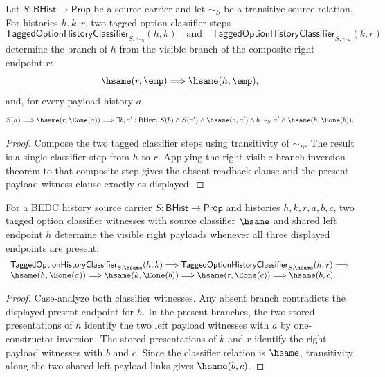 \begin{theorem}
\label{thm:tagged-option-history-classifier-composite-right-visible-readback}
Let $S:\mathsf{BHist}\to\mathsf{Prop}$ be a source carrier and let
$\sim_S$ be a transitive source relation. For histories $h,k,r$, two tagged
option classifier steps
$$
\mathsf{TaggedOptionHistoryClassifier}_{S,\sim_S}(h,k)
\quad\text{and}\quad
\mathsf{TaggedOptionHistoryClassifier}_{S,\sim_S}(k,r)
$$
determine the branch of $h$ from the visible branch of the composite right
endpoint $r$:
$$
\hsame(r,\emp)\Longrightarrow \hsame(h,\emp),
$$
and, for every payload history $a$,
$$
S(a)\Longrightarrow \hsame(r,\Eone(a))\Longrightarrow
\exists b,a':\mathsf{BHist}.\;
S(b)\land S(a')\land \hsame(a,a')\land b\sim_S a'\land
\hsame(h,\Eone(b)).
$$
\end{theorem}
\begin{proof}
Compose the two tagged classifier steps using transitivity of $\sim_S$. The
result is a single classifier step from $h$ to $r$. Applying the right
visible-branch inversion theorem to that composite step gives the absent
readback clause and the present payload witness clause exactly as displayed.
\end{proof}

\begin{theorem}
\label{thm:tagged-option-history-classifier-hsame-shared-left-visible-right-deterministic}
For a BEDC history source carrier $S:\mathsf{BHist}\to\mathsf{Prop}$ and
histories $h,k,r,a,b,c$, two tagged option classifier witnesses with source
classifier $\hsame$ and shared left endpoint $h$ determine the visible right
payloads whenever all three displayed endpoints are present:
$$
\begin{array}{l}
\mathsf{TaggedOptionHistoryClassifier}_{S,\hsame}(h,k)
\Longrightarrow
\mathsf{TaggedOptionHistoryClassifier}_{S,\hsame}(h,r)
\Longrightarrow
\\
\hsame(h,\Eone(a))
\Longrightarrow
\hsame(k,\Eone(b))
\Longrightarrow
\hsame(r,\Eone(c))
\Longrightarrow
\hsame(b,c).
\end{array}
$$
\end{theorem}
\begin{proof}
Case-analyze both classifier witnesses. Any absent branch contradicts the
displayed present endpoint for $h$. In the present branches, the two stored
presentations of $h$ identify the two left payload witnesses with $a$ by
one-constructor inversion. The stored presentations of $k$ and $r$ identify the
right payload witnesses with $b$ and $c$. Since the classifier relation is
$\hsame$, transitivity along the two shared-left payload links gives
$\hsame(b,c)$.
\end{proof}
